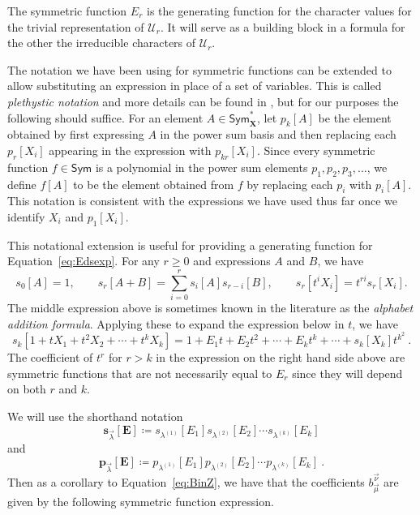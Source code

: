 \documentclass[ALCO,Unicode]{cedram}
\newcommand{\defncolor}{\color{darkred}}
\newcommand{\defn}[1]{{\defncolor\emph{#1}}} %
\newcommand{\XXX}{\mathbf{X}}
\newcommand{\EEE}{\mathbf{E}}
\begin{document}
The symmetric function $E_r$ is the generating function
for the character values for the trivial representation of $\mathcal{U}_r$. It will serve as
a building block in a formula for the other the irreducible characters of $\mathcal{U}_r$.

The notation we have been using for symmetric functions can be extended
to allow substituting an expression in place of a set of variables.
This is called \defn{plethystic notation} and more details can be found in \cite{LR},
but for our purposes the following should suffice.
For an element $A \in \mathsf{Sym}^{\ast}_{\XXX}$, let $p_k[A]$ be the element
obtained by first expressing $A$ in the power sum basis and then
replacing each $p_r[X_i]$ appearing in the expression with $p_{kr}[X_i]$.
Since every symmetric function $f \in \mathsf{Sym}$ is a polynomial in the power sum elements
$p_1, p_2, p_3, \ldots$, we define $f[A]$ to be the element obtained from $f$ by
replacing each $p_i$ with $p_i[A]$.
This notation is consistent with the expressions we have used thus far once we identify $X_i$ and $p_1[X_i]$.

\begin{remark}
This notational extension is useful for
providing a generating function for
Equation~\eqref{eq:Edsexp}.  For any $r\geqslant0$ and
expressions $A$ and $B$, we have
\begin{equation*}
s_0[A] = 1,
\qquad
s_r[A+B] = \sum_{i=0}^r s_i[A] s_{r-i}[B],
\qquad
s_r[t^i X_i] = t^{ri} s_r[X_i].
\end{equation*}
The middle expression above is sometimes known in the literature as the
\emph{alphabet addition formula}. Applying these to expand the
expression below in $t$, we have
\[
    s_k[1 + t X_1 + t^2 X_2 + \cdots + t^k X_k]
    = 1 + E_1 t + E_2 t^2 + \cdots + E_k t^k + \cdots + s_k[X_k] t^{k^2}~.
\]
The coefficient of $t^r$ for $r>k$ in the expression on the
right hand side above are symmetric functions that are
not necessarily equal to $E_r$ since they will depend on both $r$ and $k$.
\end{remark}

We will use the shorthand notation
$$\mathbf{s}_{\vec{\lambda}}[\EEE] \coloneqq s_{\lambda^{(1)}}[E_1]s_{\lambda^{(2)}}[E_2]
\cdots s_{\lambda^{(k)}}[E_k]$$
and
$$\mathbf{p}_{\vec{\lambda}}[\EEE] \coloneqq p_{\lambda^{(1)}}[E_1]p_{\lambda^{(2)}}[E_2]
\cdots p_{\lambda^{(k)}}[E_k]~.$$
Then as a corollary to Equation~\eqref{eq:BinZ}, we have that the
coefficients $b_{\vec{\mu}}^{\vec{\nu}}$ are given by the following symmetric function expression.
\end{document}
